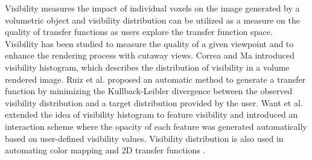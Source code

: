 Visibility measures the impact of individual voxels on the image generated by a volumetric object and visibility distribution can be utilized as a measure on the quality of transfer functions as users explore the transfer function space. Visibility has been studied to measure the quality of a given viewpoint \cite{bordoloi_view_2005} \cite{viola_importance-driven_2004} and to enhance the rendering process with cutaway views.
Correa and Ma \cite{correa_visibility_2011} introduced visibility histogram, which describes the distribution of visibility in a volume rendered image.
Ruiz et al. \cite{ruiz_automatic_2011} proposed an automatic method to generate a transfer function by minimizing the Kullback-Leibler divergence between the observed visibility distribution and a target distribution provided by the user. Want et al. \cite{wang_efficient_2011} extended the idea of visibility histogram to feature visibility and introduced an interaction scheme where the opacity of each feature was generated automatically based on user-defined visibility values. Visibility distribution is also used in automating color mapping \cite{cai_automatic_2013} and 2D transfer functions \cite{qin_voxel_2015}.





